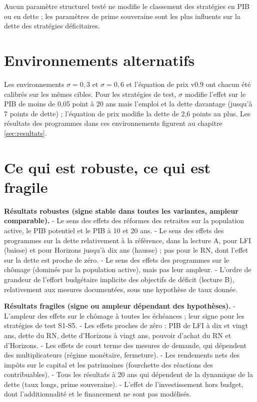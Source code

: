 \documentclass[
  11pt,
  11pt,
  a4paper,
  openany]{book}
\begin{document}
Aucun paramètre structurel testé ne modifie le classement des stratégies
en PIB ou en dette ; les paramètres de prime souveraine sont les plus
influents sur la dette des stratégies déficitaires.

\hypertarget{sec:robustesse-env}{%
\section{Environnements alternatifs}\label{sec:robustesse-env}}

Les environnements \(\sigma = 0{,}3\) et \(\sigma = 0{,}6\) et
l'équation de prix v0.9 ont chacun été calibrés sur les mêmes cibles.
Pour les stratégies de test, \(\sigma\) modifie l'effet sur le PIB de
moins de 0,05 point à 20 ans mais l'emploi et la dette davantage
(jusqu'à 7 points de dette) ; l'équation de prix modifie la dette de 2,6
points au plus. Les résultats des programmes dans ces environnements
figurent au chapitre \ref{sec:resultats}.

\hypertarget{sec:robuste-fragile}{%
\section{Ce qui est robuste, ce qui est
fragile}\label{sec:robuste-fragile}}

\textbf{Résultats robustes (signe stable dans toutes les variantes,
ampleur comparable).} - Le sens des effets des réformes des retraites
sur la population active, le PIB potentiel et le PIB à 10 et 20 ans. -
Le sens des effets des programmes sur la dette relativement à la
référence, dans la lecture A, pour LFI (baisse) et pour Horizons jusqu'à
dix ans (hausse) ; pas pour le RN, dont l'effet sur la dette est proche
de zéro. - Le sens des effets des programmes sur le chômage (dominés par
la population active), mais pas leur ampleur. - L'ordre de grandeur de
l'effort budgétaire implicite des objectifs de déficit (lecture B),
relativement aux mesures documentées, sous une hypothèse de taux donnée.

\textbf{Résultats fragiles (signe ou ampleur dépendant des hypothèses).}
- L'ampleur des effets sur le chômage à toutes les échéances ; leur
signe pour les stratégies de test S1-S5. - Les effets proches de zéro :
PIB de LFI à dix et vingt ans, dette du RN, dette d'Horizons à vingt
ans, pouvoir d'achat du RN et d'Horizons. - Les effets de court terme
des mesures de demande, qui dépendent des multiplicateurs (régime
monétaire, fermeture). - Les rendements nets des impôts sur le capital
et les patrimoines (fourchette des réactions des contribuables). - Tous
les résultats à 20 ans qui dépendent de la dynamique de la dette (taux
longs, prime souveraine). - L'effet de l'investissement hors budget,
dont l'additionnalité et le financement ne sont pas modélisés.
\end{document}
